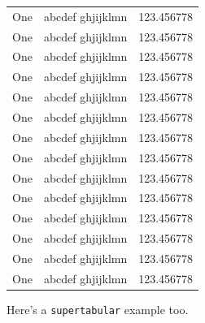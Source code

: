 \begin{longtable}[c]{|l|l|l|}
One & abcdef ghjijklmn & 123.456778 \\
One & abcdef ghjijklmn & 123.456778 \\
One & abcdef ghjijklmn & 123.456778 \\
One & abcdef ghjijklmn & 123.456778 \\
One & abcdef ghjijklmn & 123.456778 \\
One & abcdef ghjijklmn & 123.456778 \\
One & abcdef ghjijklmn & 123.456778 \\
One & abcdef ghjijklmn & 123.456778 \\
One & abcdef ghjijklmn & 123.456778 \\
One & abcdef ghjijklmn & 123.456778 \\
One & abcdef ghjijklmn & 123.456778 \\
One & abcdef ghjijklmn & 123.456778 \\
One & abcdef ghjijklmn & 123.456778 \\
One & abcdef ghjijklmn & 123.456778 \\
\end{longtable}

\clearpage
Here's a \texttt{supertabular} example too.

